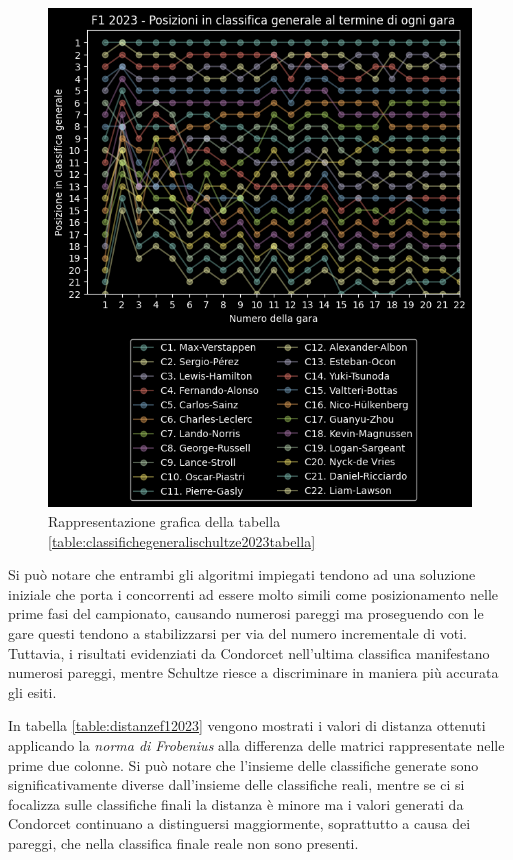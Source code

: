 \documentclass[12pt,a4paper,openright,twoside]{book}
\begin{document}
\begin{figure}[H]
    \centering
     \includegraphics[scale=1.0]{figures/schultzestandings2023.png}
     \caption{Rappresentazione grafica della tabella \ref{table:classifichegeneralischultze2023tabella} }
     \label{fig:classifichegeneralischultze2023figura}
 \end{figure}

 Si può notare che entrambi gli algoritmi impiegati tendono ad una soluzione iniziale che porta i concorrenti ad essere
 molto simili come posizionamento nelle prime fasi del campionato, causando numerosi pareggi ma proseguendo con le gare
 questi tendono a stabilizzarsi per via del numero incrementale di voti. Tuttavia, i risultati evidenziati da Condorcet 
 nell'ultima classifica manifestano numerosi pareggi, mentre Schultze riesce a discriminare in maniera più accurata
 gli esiti.

 In tabella \ref{table:distanzef12023} vengono mostrati i valori di distanza ottenuti applicando la 
 \textit{norma di Frobenius} alla differenza delle matrici rappresentate nelle prime due colonne.
 Si può notare che l'insieme delle classifiche generate sono significativamente diverse dall'insieme delle classifiche reali,
 mentre se ci si focalizza sulle classifiche finali la distanza è minore ma i valori generati da 
 Condorcet continuano a distinguersi maggiormente, soprattutto a causa dei pareggi, che nella classifica finale reale
 non sono presenti.
\end{document}

